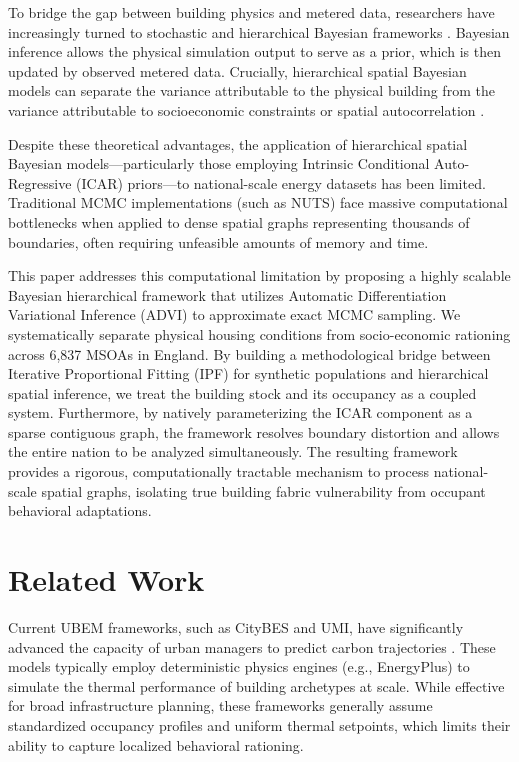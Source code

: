 \documentclass[11pt, a4paper, twocolumn]{article}
\begin{document}
To bridge the gap between building physics and metered data, researchers have increasingly turned to stochastic and hierarchical Bayesian frameworks \cite{Booth2013, petrou2024bayesian, Wang2021}. Bayesian inference allows the physical simulation output to serve as a prior, which is then updated by observed metered data. Crucially, hierarchical spatial Bayesian models can separate the variance attributable to the physical building from the variance attributable to socioeconomic constraints or spatial autocorrelation \cite{NetoBradley2021}. 

Despite these theoretical advantages, the application of hierarchical spatial Bayesian models---particularly those employing Intrinsic Conditional Auto-Regressive (ICAR) priors---to national-scale energy datasets has been limited. Traditional MCMC implementations (such as NUTS) face massive computational bottlenecks when applied to dense spatial graphs representing thousands of boundaries, often requiring unfeasible amounts of memory and time.

This paper addresses this computational limitation by proposing a highly scalable Bayesian hierarchical framework that utilizes Automatic Differentiation Variational Inference (ADVI) to approximate exact MCMC sampling. We systematically separate physical housing conditions from socio-economic rationing across 6,837 MSOAs in England. By building a methodological bridge between Iterative Proportional Fitting (IPF) for synthetic populations and hierarchical spatial inference, we treat the building stock and its occupancy as a coupled system. Furthermore, by natively parameterizing the ICAR component as a sparse contiguous graph, the framework resolves boundary distortion and allows the entire nation to be analyzed simultaneously. The resulting framework provides a rigorous, computationally tractable mechanism to process national-scale spatial graphs, isolating true building fabric vulnerability from occupant behavioral adaptations.

\section{Related Work}\label{related-work}

Current UBEM frameworks, such as CityBES and UMI, have significantly advanced the capacity of urban managers to predict carbon trajectories \cite{Chen2017, Reinhart2016}. These models typically employ deterministic physics engines (e.g., EnergyPlus) to simulate the thermal performance of building archetypes at scale. While effective for broad infrastructure planning, these frameworks generally assume standardized occupancy profiles and uniform thermal setpoints, which limits their ability to capture localized behavioral rationing.
\end{document}
